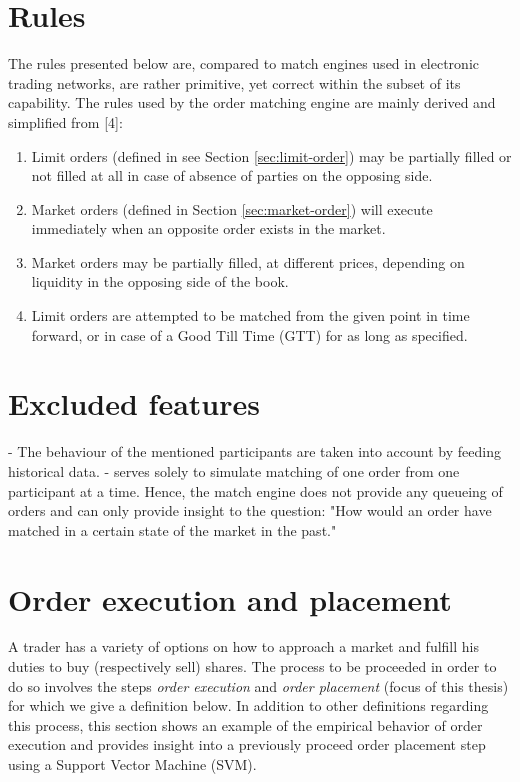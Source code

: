 \section{Rules}

The rules presented below are, compared to match engines used in electronic trading networks, are rather primitive, yet correct within the subset of its capability.
The rules used by the order matching engine are mainly derived and simplified from [4]:
\begin{enumerate}
    \item Limit orders (defined in see Section \ref{sec:limit-order}) may be partially filled or not filled at all in case of absence of parties on the opposing side.
    \item Market orders (defined in Section \ref{sec:market-order}) will execute immediately when an opposite order exists in the market.
    \item Market orders may be partially filled, at different prices, depending on liquidity in the opposing side of the book.
    \item Limit orders are attempted to be matched from the given point in time forward, or in case of a Good Till Time (GTT) for as long as specified.
\end{enumerate}


\section{Excluded features}


- The behaviour of the mentioned participants are taken into account by feeding historical data.
- serves solely to simulate matching of one order from one participant at a time. Hence, the match engine does not provide any queueing of orders and can only provide insight to the question: "How would an order have matched in a certain state of the market in the past."



\section{Order execution and placement}

A trader has a variety of options on how to approach a market and fulfill his duties to buy (respectively sell) shares.
The process to be proceeded in order to do so involves the steps \textit{order execution} and \textit{order placement} (focus of this thesis) for which we give a definition below.
In addition to other definitions regarding this process, this section shows an example of the empirical behavior of order execution and provides insight into a previously proceed order placement step using a Support Vector Machine (SVM).


